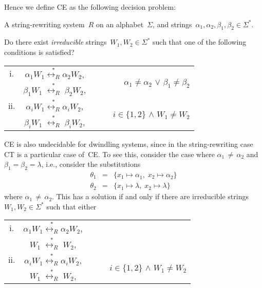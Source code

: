 \documentclass{lmcs} %
\theoremstyle{plain}\newtheorem{satz}[thm]{Satz} %
\newcommand{\ignore}[1]{}
\begin{document}
Hence we define CE as the following decision problem:

\begin{description}[align=left]
\item[Input] A string-rewriting system~$R$ on an alphabet~$\Sigma$, and 
strings~$\alpha_1, \alpha_2, \beta_1, \beta_2 \in \Sigma_{}^*$.
\item[Question] Do there exist 
\emph{irreducible} 
strings~$W_1, W_2 \in \Sigma^*$ such that one of the following conditions is satisfied?
\end{description}
\begin{tabular}{ c c r }
i. & $\alpha_1 W_1 \stackrel{*}{{\longleftrightarrow}_R} \alpha_2 W_2$, & \multirow{2}{20em}{$\;\;\;\;\;\;\;$$\alpha_1 \neq \alpha_2$ $\lor$ $\beta_1 \neq \beta_2$} \\[5pt]
& $\beta_1 W_1 \; \stackrel{*}{{\longleftrightarrow}_R} \; \beta_2 W_2$, & \\[10pt]
ii. & $\alpha_i W_1 \stackrel{*}{{\longleftrightarrow}_R} \alpha_i W_2$, & \multirow{2}{20em}{$\;\;\;\;\;\;\;$ $i \in \{1, 2\} $ $\land$ $W_1 \neq W_2$} \\[5pt]
& $ \beta_i  W_1 \; \stackrel{*}{{\longleftrightarrow}_R} \; \beta_i W_2$,  & \\[10pt]
\end{tabular}

CE is also undecidable for dwindling systems, since
in the string-rewriting case CT is a particular case of~CE. To see this,
consider the case where $\alpha_1 \, \neq \, \alpha_2$ and
$\beta_1 = \beta_2 = \lambda$, i.e., consider
the substitutions
\begin{eqnarray*}
\theta^{}_1 & = & \{ x_1 \mapsto \alpha^{}_1, \; x_2 \mapsto \alpha^{}_2\} \\
\theta^{}_2 & = & \{ x_1 \mapsto \lambda ,  \; x_2 \mapsto \lambda \}
\end{eqnarray*}
where $\alpha_1 \, \neq \, \alpha_2$.
This has a solution if and only if there are irreducible strings~$W_1, W_2 \in \Sigma^*$ such that either

\begin{tabular}{ c c r }
i. & $\alpha_1 W_1 \stackrel{*}{{\longleftrightarrow}_R} \alpha_2 W_2$, & \multirow{2}{20em}{$\;\;\;\;\;\;\;$} \\[5pt]
& $ W_1 \; \stackrel{*}{{\longleftrightarrow}_R} \; W_2$, & $\qquad$ or \\[10pt]
ii. & $\alpha_i W_1 \stackrel{*}{{\longleftrightarrow}_R} \alpha_i W_2$, & \multirow{2}{20em}{$\;\;\;\;\;\;\;$ $i \in \{1, 2\} $ $\land$ $W_1 \neq W_2$} \\[5pt]
& $   W_1 \; \stackrel{*}{{\longleftrightarrow}_R} \;  W_2$,  & \\[10pt]
\end{tabular}
\ignore{
if $\beta_1 = \beta_2 = \lambda$, then \[
\alpha_1 W_1 \; \stackrel{*}{{\longleftrightarrow}_R} \; \alpha_2 W_2 \; \; ~ \text{and} ~ \; \;
W_1 \; \stackrel{*}{{\longleftrightarrow}_R} \; W_2 \]
}
\end{document}
